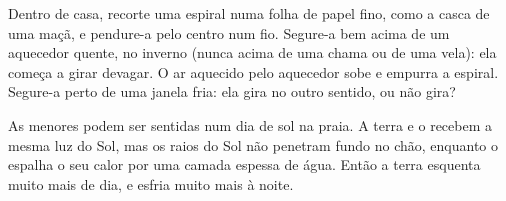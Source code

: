 \begin{inthelab}
Dentro de casa, recorte uma espiral numa folha de papel fino, como a casca
de uma maçã, e pendure-a pelo centro num fio. Segure-a bem acima de um
aquecedor quente, no inverno (nunca acima de uma chama ou de uma vela):
ela começa a girar devagar. O ar aquecido pelo aquecedor sobe e empurra a
espiral. Segure-a perto de uma janela fria: ela gira no outro sentido, ou
não gira?
\end{inthelab}

As menores  podem ser sentidas num dia de sol na
praia. A terra e o  recebem a mesma luz do Sol, mas os raios do Sol não
penetram fundo no chão, enquanto o  espalha o seu calor por uma camada
espessa de água. Então a terra esquenta muito mais de dia, e esfria muito
mais à noite.

